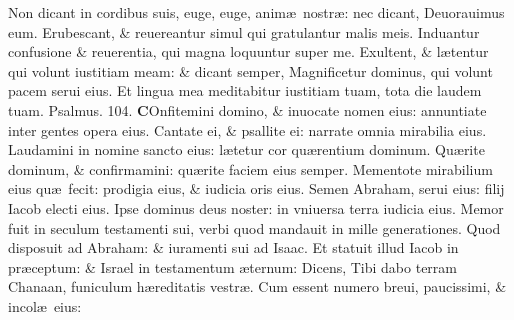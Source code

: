 \documentclass[a5paper,10pt]{book}
\def\ae{æ}
\begin{document}
\begin{multicols*}{2}
\newline \color{red} N\color{black}on dicant in cordibus suis, euge, euge, anim\ae \ nostr\ae : nec dicant, Deuorauimus eum.
\newline \color{red} E\color{black}rubescant, \& reuereantur simul qui gratulantur malis meis.
\newline \color{red} I\color{black}nduantur confusione \& reuerentia, qui magna loquuntur super me.
\newline \color{red} E\color{black}xultent, \& l\ae tentur qui volunt iustitiam meam: \& dicant semper, Magnificetur dominus, qui volunt pacem serui eius.
\newline \color{red} E\color{black}t lingua mea meditabitur iustitiam tuam, tota die laudem tuam.
\newline \color{red} Psalmus. \hypertarget{ps104}{104.} \color{black}
\vspace{-.5em}
\lettrine[lines=2]{\bfseries \color{red} C}{}Onfitemini domino, \& inuocate nomen eius: annuntiate inter gentes opera eius.
\newline \color{red} C\color{black}antate ei, \& psallite ei: narrate omnia mirabilia eius.
\newline \color{red} L\color{black}audamini in nomine sancto eius: l\ae tetur cor qu\ae rentium dominum.
\newline \color{red} Q\color{black}u\ae rite dominum, \& confirmamini: qu\ae rite faciem eius semper.
\newline \color{red} M\color{black}ementote mirabilium eius qu\ae \ fecit: prodigia eius, \& iudicia oris eius.
\newline \color{red} S\color{black}emen Abraham, serui eius: filij Iacob electi eius.
\newline \color{red} I\color{black}pse dominus deus noster: in vniuersa terra iudicia eius.
\newline \color{red} M\color{black}emor fuit in seculum testamenti sui, verbi quod mandauit in mille generationes.
\newline \color{red} Q\color{black}uod disposuit ad Abraham: \& iuramenti sui ad Isaac.
\newline \color{red} E\color{black}t statuit illud Iacob in pr\ae ceptum: \& Israel in testamentum \ae ternum:
\newline \color{red} D\color{black}icens, Tibi dabo terram Chanaan, funiculum h\ae reditatis vestr\ae .
\newline \color{red} C\color{black}um essent numero breui, paucissimi, \& incol\ae \ eius:

\end{multicols*}
\end{document}
